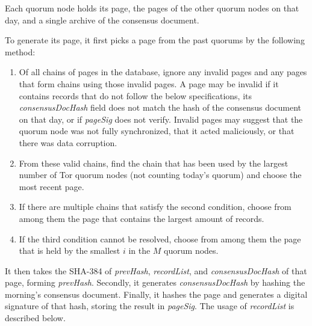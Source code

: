 Each quorum node holds its page, the pages of the other quorum nodes on that day, and a single archive of the consensus document. 

To generate its page, it first picks a page from the past quorums by the following method:


\begin{enumerate}
	\item Of all chains of pages in the database, ignore any invalid pages and any pages that form chains using those invalid pages. A page may be invalid if it contains records that do not follow the below specifications, its \textit{consensusDocHash} field does not match the hash of the consensus document on that day, or if \textit{pageSig} does not verify. Invalid pages may suggest that the quorum node was not fully synchronized, that it acted maliciously, or that there was data corruption.
	\item From these valid chains, find the chain that has been used by the largest number of Tor quorum nodes (not counting today's quorum) and choose the most recent page.
	\item If there are multiple chains that satisfy the second condition, choose from among them the page that contains the largest amount of records.
	\item If the third condition cannot be resolved, choose from among them the page that is held by the smallest $ i $ in the $ M $ quorum nodes.
\end{enumerate}

It then takes the SHA-384 of \textit{prevHash}, \textit{recordList}, and \textit{consensusDocHash} of that page, forming \textit{prevHash}. Secondly, it generates \textit{consensusDocHash} by hashing the morning's consensus document. Finally, it hashes the page and generates a digital signature of that hash, storing the result in \textit{pageSig}. The usage of \textit{recordList} is described below.

